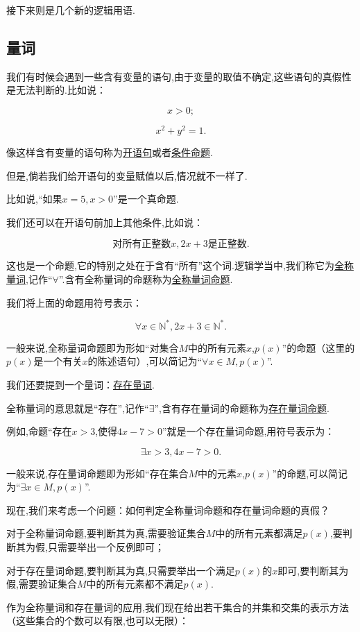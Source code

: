 \documentclass[lang=cn,math=cm,chinesefont=nofont,11pt,scheme=chinese,twocol]{elegantbook}
\begin{document}
接下来则是几个新的逻辑用语.

\subsection{量词}

我们有时候会遇到一些含有变量的语句,由于变量的取值不确定,这些语句的真假性是无法判断的.比如说：

$$x>0;$$

$$x^2+y^2=1.$$

像这样含有变量的语句称为\underline{开语句}或者\underline{条件命题}.

但是,倘若我们给开语句的变量赋值以后,情况就不一样了.

比如说,“如果$x=5,x>0$”是一个真命题.

我们还可以在开语句前加上其他条件,比如说：

$$\text{对所有正整数}x,2x+3\text{是正整数.}$$

这也是一个命题,它的特别之处在于含有“所有”这个词.逻辑学当中,我们称它为\underline{全称量词},记作“$\forall$”.含有全称量词的命题称为\underline{全称量词命题}.

我们将上面的命题用符号表示：

$$\forall x\in\mathbb{N}^*,2x+3\in\mathbb{N}^*.$$

一般来说,全称量词命题即为形如“对集合$M$中的所有元素$x$,$p(x)$”的命题（这里的$p(x)$是一个有关$x$的陈述语句）,可以简记为“$\forall x\in M,p(x)$”.

\hspace*{\fill}

我们还要提到一个量词：\underline{存在量词}.

全称量词的意思就是“存在”,记作“$\exists$”,含有存在量词的命题称为\underline{存在量词命题}.

例如,命题“存在$x>3$,使得$4x-7>0$”就是一个存在量词命题,用符号表示为：

$$\exists x>3,4x-7>0.$$

一般来说,存在量词命题即为形如“存在集合$M$中的元素$x$,$p(x)$”的命题,可以简记为“$\exists x\in M,p(x)$”.

现在,我们来考虑一个问题：如何判定全称量词命题和存在量词命题的真假？

对于全称量词命题,要判断其为真,需要验证集合$M$中的所有元素都满足$p(x)$,要判断其为假,只需要举出一个反例即可；

对于存在量词命题,要判断其为真,只需要举出一个满足$p(x)$的$x$即可,要判断其为假,需要验证集合$M$中的所有元素都不满足$p(x)$.

作为全称量词和存在量词的应用,我们现在给出若干集合的并集和交集的表示方法（这些集合的个数可以有限,也可以无限）：
\end{document}
